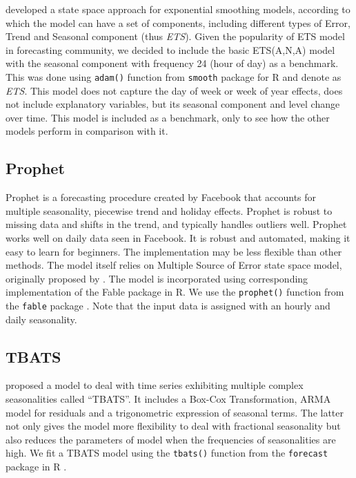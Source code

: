 \documentclass[]{elsarticle} %
\begin{document}
\citet{Hyndman2008b} developed a state space approach for exponential smoothing models, according to which the model can have a set of components, including different types of Error, Trend and Seasonal component (thus \emph{ETS}). Given the popularity of ETS model in forecasting community, we decided to include the basic ETS(A,N,A) model with the seasonal component with frequency 24 (hour of day) as a benchmark. This was done using \texttt{adam()} function from \texttt{smooth} package \citep{Svetunkov2021Smooth} for R and denote as \emph{ETS}. This model does not capture the day of week or week of year effects, does not include explanatory variables, but its seasonal component and level change over time. This model is included as a benchmark, only to see how the other models perform in comparison with it.

\hypertarget{prophet}{%
\subsection{Prophet}\label{prophet}}

Prophet is a forecasting procedure created by Facebook \citep{taylor2018forecasting} that accounts for multiple seasonality, piecewise trend and holiday effects. Prophet is robust to missing data and shifts in the trend, and typically handles outliers well. Prophet works well on daily data seen in Facebook. It is robust and automated, making it easy to learn for beginners. The implementation may be less flexible than other methods. The model itself relies on Multiple Source of Error state space model, originally proposed by \citet{Kalman1960}. The model is incorporated using corresponding implementation of the Fable package in R. We use the \texttt{prophet()} function from the \texttt{fable} package \citep{fable2020}. Note that the input data is assigned with an hourly and daily seasonality.

\hypertarget{tbats}{%
\subsection{TBATS}\label{tbats}}

\citet{de2011forecasting} proposed a model to deal with time series exhibiting multiple complex seasonalities called ``TBATS''. It includes a Box-Cox Transformation, ARMA model for residuals and a trigonometric expression of seasonal terms. The latter not only gives the model more flexibility to deal with fractional seasonality but also reduces the parameters of model when the frequencies of seasonalities are high. We fit a TBATS model using the \texttt{tbats()} function from the \texttt{forecast} package in R \citep{forecastpackage2020}.
\end{document}
